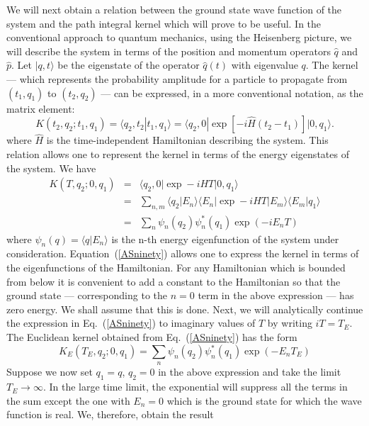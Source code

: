 \documentclass[12pt]{iopart}
\def\eq#1{{Eq.~(\ref{#1})}}
\begin{document}
We will next obtain a relation between the ground state wave function of the system and the path integral
kernel which will prove to be useful. 
In the conventional approach to quantum mechanics, using the Heisenberg
picture, we will   describe the system in terms of the position and momentum operators $\hat q$
and $\hat p$. Let $|q,t\rangle  $ be the eigenstate of the operator $\hat q (t)$ with eigenvalue
$q$.
The kernel --- which represents the probability amplitude for a particle
 to propagate
from $(t_1,q_1)$ to $(t_2,q_2)$ --- can be expressed, in a more conventional
notation, as the matrix element: 
\begin{equation}K(t_2,q_2;t_1,q_1)=\langle q_2,t_2|t_1,q_1\rangle  
=\langle q_2,0|\exp [-{i}\hat H(t_2-t_1)]|0,q_1\rangle  .
\end{equation}
where $\hat H$ is the time-independent Hamiltonian describing the system.
This relation allows one to represent the kernel in terms of the energy eigenstates
of the system. We have
\begin{eqnarray} 
K(T,q_2;0,q_1)&=& \langle q_2,0|\exp -{i}HT|0,q_1\rangle  \nonumber\\
&=&\sum_{n,m}
\langle q_2|E_n\rangle  \langle E_n|\exp -{i}HT|E_m\rangle  \langle E_m|q_1\rangle  \nonumber\\
          &=&\sum_n\psi_n(q_2)\psi^*_n(q_1)\exp (-{i}E_nT)
	  \label{ASninety}
	  \end{eqnarray}
where $\psi_n(q)=\langle q|E_n\rangle  $ is the n-th energy eigenfunction of the system under consideration.
Equation~(\ref{ASninety}) allows one to express the kernel in terms of the eigenfunctions of the Hamiltonian.
For any Hamiltonian which is bounded from below it is convenient to add  a constant to the 
Hamiltonian so that the ground state --- corresponding to the $n=0$ term in the 
above expression ---  has zero energy. We shall assume that this is done.
Next, we will analytically continue the expression
in \eq{ASninety} to imaginary values of $T$ by writing $iT = T_E$.
The Euclidean kernel obtained from \eq{ASninety}  has the form 
\begin{equation}
K_E(T_E, q_2; 0, q_1) = \sum_n \psi_n (q_2)\psi_n^* (q_1) \exp(-E_n T_E)
\end{equation} 
Suppose we now set $q_1 =q$, $q_2 =0$ in the above expression and take the limit
$T_E\to \infty$. In the large time limit, the exponential will suppress all the terms
in the sum except the one with $E_n=0$ which is the ground state for which the wave function is real.
We, therefore, obtain the result
\end{document}
